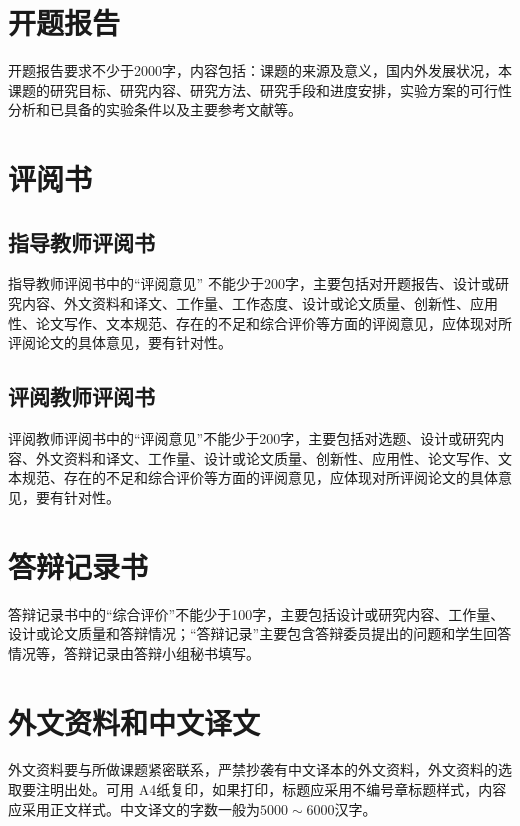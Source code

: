\section{开题报告}
开题报告要求不少于2000字，内容包括：课题的来源及意义，国内外发展状况，本课题的研究目标、研究内容、研究方法、研究手段和进度安排，实验方案的可行性分析和已具备的实验条件以及主要参考文献等。

\section{评阅书}

\subsection{指导教师评阅书}

指导教师评阅书中的“评阅意见” 不能少于200字，主要包括对开题报告、设计或研究内容、外文资料和译文、工作量、工作态度、设计或论文质量、创新性、应用性、论文写作、文本规范、存在的不足和综合评价等方面的评阅意见，应体现对所评阅论文的具体意见，要有针对性。

\subsection{评阅教师评阅书}

评阅教师评阅书中的“评阅意见”不能少于200字，主要包括对选题、设计或研究内容、外文资料和译文、工作量、设计或论文质量、创新性、应用性、论文写作、文本规范、存在的不足和综合评价等方面的评阅意见，应体现对所评阅论文的具体意见，要有针对性。

\section{答辩记录书}

答辩记录书中的“综合评价”不能少于100字，主要包括设计或研究内容、工作量、设计或论文质量和答辩情况；“答辩记录”主要包含答辩委员提出的问题和学生回答情况等，答辩记录由答辩小组秘书填写。

\section{外文资料和中文译文}

外文资料要与所做课题紧密联系，严禁抄袭有中文译本的外文资料，外文资料的选取要注明出处。可用 A4纸复印，如果打印，标题应采用不编号章标题样式，内容应采用正文样式。中文译文的字数一般为$5000\sim 6000$汉字。
